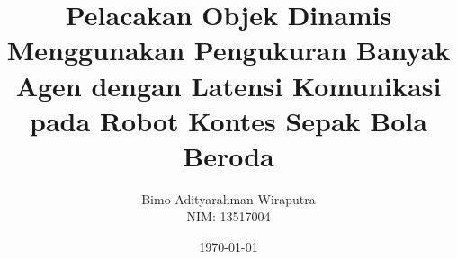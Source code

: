 \documentclass[12pt, a4paper, onecolumn, oneside, final]{report}
\begin{document}
\title{Pelacakan Objek Dinamis Menggunakan Pengukuran Banyak Agen dengan Latensi Komunikasi pada Robot Kontes Sepak Bola Beroda}
\date{\today}
\author{
    Bimo Adityarahman Wiraputra \\
    NIM: 13517004
}

\setcounter{page}{0}





\pagestyle{plain}




\renewcommand*\contentsname{DAFTAR ISI}
\renewcommand*\listfigurename{DAFTAR GAMBAR}
\renewcommand*\listtablename{DAFTAR TABEL}
\renewcommand*\bibname{DAFTAR PUSTAKA}

\tableofcontents
{%
    \let\oldnumberline\numberline%
    \renewcommand{\numberline}{\figurename~\oldnumberline}%
    \listoffigures%
}


\renewcommand{\chaptername}{BAB}
\renewcommand{\thechapter}{\Roman{chapter}}







\begingroup
\renewcommand{\baselinestretch}{1.0}
\printbibliography[heading=bibintoc]
\endgroup


%     
%     
\end{document}
